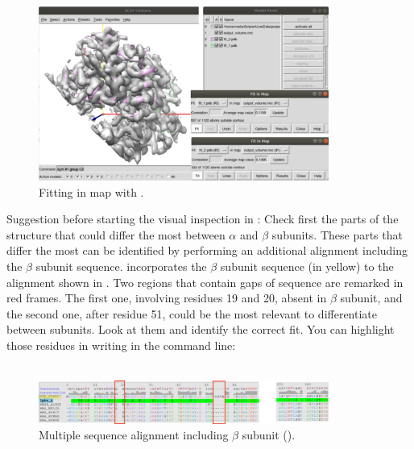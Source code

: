  \begin{figure}[H]
  \centering 
  \captionsetup{width=.7\linewidth} 
  \includegraphics[width=0.85\textwidth]{Images/Fig22}
  \caption{Fitting in map with \chimera.}
  \label{fig:chimera_fit_in_map}
  \end{figure}
  
  Suggestion before starting the visual inspection in \chimera: Check first the parts of the structure that could differ the most between  $\alpha$ and $\beta$ subunits. These parts that differ the most can be identified by performing an additional alignment including the $\beta$ subunit sequence.  incorporates the $\beta$ subunit sequence (in yellow) to the alignment shown in . Two regions that contain gaps of sequence are remarked in red frames. The first one, involving residues 19 and 20, absent in $\beta$ subunit, and the second one, after residue 51, could be the most relevant to differentiate between subunits. Look at them and identify the correct fit. You can highlight those residues in \chimera writing in the command line:\\
  \\
  
  \begin{figure}[H]
  \centering 
  \captionsetup{width=.7\linewidth} 
  \includegraphics[width=0.85\textwidth]{Images/Fig23}
  \caption{Multiple sequence alignment including  $\beta$ subunit ().}
  \label{fig:multiple_alignment_HBB}
  \end{figure}
  
